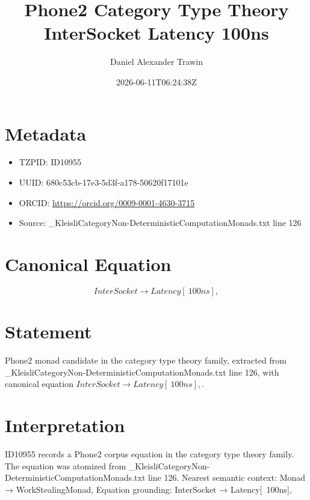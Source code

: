 \documentclass[11pt]{article}
\title{Phone2 Category Type Theory InterSocket Latency 100ns}
\author{Daniel Alexander Trawin}
\date{2026-06-11T06:24:38Z}
\begin{document}
\maketitle
\section*{Metadata}
\begin{itemize}
\item TZPID: ID10955
\item UUID: 680c53cb-17e3-5d3f-a178-50620f17101e
\item ORCID: \url{https://orcid.org/0009-0001-4630-3715}
\item Source: _KleisliCategoryNon-DeterministicComputationMonads.txt line 126
\end{itemize}
\section*{Canonical Equation}
\[
InterSocket → Latency[~100ns],
\]
\section*{Statement}
Phone2 monad candidate in the category type theory family, extracted from _KleisliCategoryNon-DeterministicComputationMonads.txt line 126, with canonical equation $InterSocket → Latency[~100ns],$.
\section*{Interpretation}
ID10955 records a Phone2 corpus equation in the category type theory family. The equation was atomized from _KleisliCategoryNon-DeterministicComputationMonads.txt line 126. Nearest semantic context: Monad → WorkStealingMonad, Equation grounding: InterSocket → Latency[~100ns],
\end{document}
